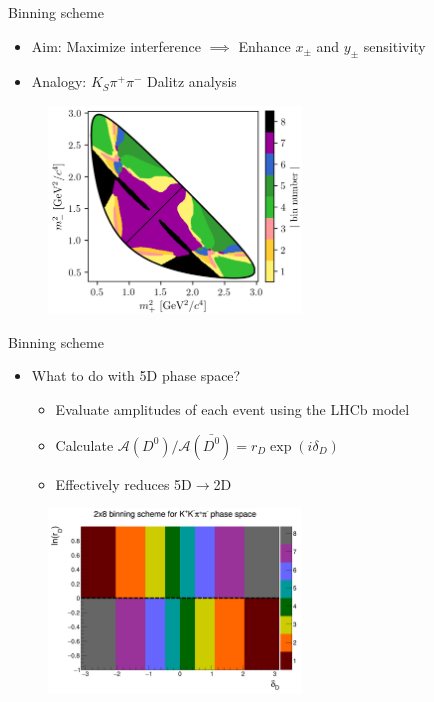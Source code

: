 \documentclass{beamer}
\begin{document}
\begin{frame}{Binning scheme}
  \begin{itemize}
    \setlength\itemsep{1.3em}
    \item{Aim: Maximize interference $\implies$ Enhance $x_\pm$ and $y_\pm$ sensitivity}
    \item{Analogy: $K_S\pi^+\pi^-$ Dalitz analysis}
  \end{itemize}
  \begin{figure}
    \centering
    \includegraphics[width = 0.6\textwidth]{DalitzKSpipi.png}
  \end{figure}
\end{frame}

\begin{frame}{Binning scheme}
  \begin{itemize}
    \item{What to do with 5D phase space?}
    \begin{itemize}
      \item{Evaluate amplitudes of each event using the LHCb model}
      \item{Calculate $\mathcal{A}(D^0)/\mathcal{A}(\bar{D^0}) = r_D\exp(i\delta_D)$}
      \item{Effectively reduces 5D$\to$2D}
    \end{itemize}
  \end{itemize}
  \begin{figure}
    \centering
    \includegraphics[width = 0.6\textwidth]{../Report/Plots/BinningSchemePlot.png}
  \end{figure}
\end{frame}
\end{document}
